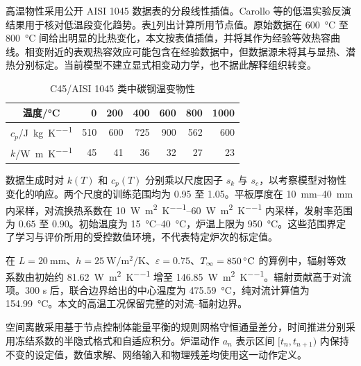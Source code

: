 
高温物性采用公开 AISI 1045 数据表的分段线性插值\cite{sanchez2023splat}。Carollo 等的低温实验反演结果用于核对低温段变化趋势\cite{carollo2019properties}。表\ref{tab:properties}列出计算所用节点值。原始数据在 \SI{600}{\degreeCelsius} 至 \SI{800}{\degreeCelsius} 间给出明显的比热变化，本文按表值插值，并将其作为经验等效热容曲线。相变附近的表观热容效应可能包含在经验数据中，但数据源未将其与显热、潜热分别标定。当前模型不建立显式相变动力学，也不据此解释组织转变。

\begin{table}[H]
  \centering
  \caption{C45/AISI 1045 类中碳钢温变物性}
  \label{tab:properties}
  \begin{tabular}{c*{6}{r}}
    \toprule
    温度/\si{\degreeCelsius} & 0 & 200 & 400 & 600 & 800 & 1000 \\
    \midrule
    $c_p$/\si{\joule\per\kilogram\per\kelvin} & 510 & 600 & 725 & 900 & 562 & 600 \\
    $k$/\si{\watt\per\metre\per\kelvin} & 45 & 41 & 36 & 32 & 27 & 23 \\
    \bottomrule
  \end{tabular}
\end{table}

数据生成时对 $k(T)$ 和 $c_p(T)$ 分别乘以尺度因子 $s_k$ 与 $s_c$，以考察模型对物性变化的响应。两个尺度的训练范围均为 0.95 至 1.05。平板厚度在 \SIrange{10}{40}{\milli\metre} 内采样，对流换热系数在 \SIrange{10}{60}{\watt\per\square\metre\per\kelvin} 内采样，发射率范围为 $0.65$ 至 $0.90$。初始温度为 \SIrange{15}{40}{\degreeCelsius}，炉温上限为 \SI{950}{\degreeCelsius}。这些范围界定了学习与评价所用的受控数值环境，不代表特定炉次的标定值。

在 $L=\SI{20}{\milli\metre}$、$h=\SI{25}{\watt\per\square\metre\per\kelvin}$、$\varepsilon=0.75$、$\Tinfty=\SI{850}{\degreeCelsius}$ 的算例中，辐射等效系数由初始约 \SI{81.62}{\watt\per\square\metre\per\kelvin} 增至 \SI{146.85}{\watt\per\square\metre\per\kelvin}。辐射贡献高于对流项。300 s 后，联合边界给出的中心温度为 \SI{475.59}{\degreeCelsius}，纯对流计算值为 \SI{154.99}{\degreeCelsius}。本文的高温工况保留完整的对流--辐射边界。

\label{sec:physical-discretization}

空间离散采用基于节点控制体能量平衡的规则网格守恒通量差分，时间推进分别采用冻结系数的半隐式格式和自适应积分。炉温动作 $a_n$ 表示区间 $[t_n,t_{n+1})$ 内保持不变的设定值，数值求解、网络输入和物理残差均使用这一动作定义。

